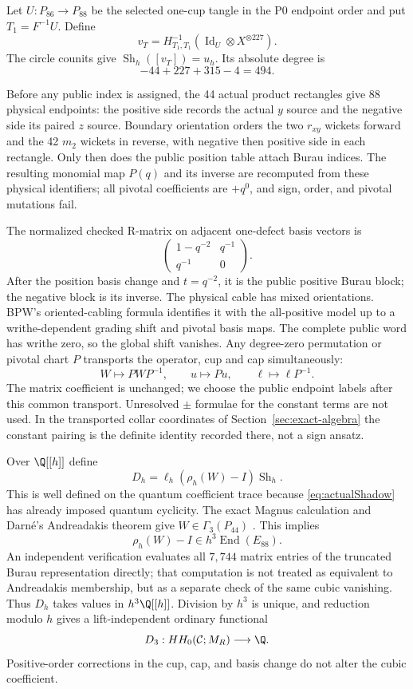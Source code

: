 Let $U:P_{86}\to P_{88}$ be the selected one-cup tangle in the P0 endpoint
order and put $T_1=F^{-1}U$.  Define
\[
v_T=H_{T_1,T_1}^{-1}
  (\operatorname{Id}_U\otimes X^{\otimes227}).
\]
The circle counits give
$\operatorname{Sh}_h([v_T])=u_h$.  Its absolute degree is
\[
-44+227+315-4=494.
\]

Before any public index is assigned, the 44 actual product rectangles give
88 physical endpoints: the positive side records the actual $y$ source and
the negative side its paired $z$ source.  Boundary orientation orders the two
$r_{xy}$ wickets forward and the 42 $m_2$ wickets in reverse, with negative
then positive side in each rectangle.  Only then does the public position
table attach Burau indices.  The resulting monomial map $P(q)$ and its inverse
are recomputed from these physical identifiers; all pivotal coefficients are
$+q^0$, and sign, order, and pivotal mutations fail.

The normalized checked R-matrix on adjacent one-defect basis vectors is
\[
\begin{pmatrix}1-q^{-2}&q^{-1}\\q^{-1}&0\end{pmatrix}.
\]
After the position basis change and $t=q^{-2}$, it is the public positive
Burau block; the negative block is its inverse.  The physical cable has mixed
orientations.  BPW's oriented-cabling formula identifies it with the
all-positive model up to a writhe-dependent grading shift and pivotal basis
maps.  The complete public word has writhe zero, so the global shift
vanishes.  Any degree-zero permutation or pivotal chart $P$ transports the
operator, cup and cap simultaneously:
\[
W\mapsto PWP^{-1},\qquad u\mapsto Pu,\qquad
\ell\mapsto\ell P^{-1}.
\]
The matrix coefficient is unchanged; we choose the public endpoint labels
after this common transport.  Unresolved $\pm$ formulae for the constant
terms are not used.  In the transported collar coordinates of
Section~\ref{sec:exact-algebra} the constant pairing is the definite
identity recorded there, not a sign ansatz.

Over $\Q[[h]]$ define
\[
D_h=\ell_h(\rho_h(W)-I)\operatorname{Sh}_h.
\]
This is well defined on the quantum coefficient trace because
\eqref{eq:actualShadow} has already imposed quantum cyclicity.  The exact
Magnus calculation and Darn\'e's Andreadakis theorem give
$W\in\Gamma_3(P_{44})$ \cite[Theorem~6.2]{Darne2021}.  This implies
\[
\rho_h(W)-I\in h^3\operatorname{End}(E_{88}).
\]
An independent verification evaluates all $7{,}744$ matrix entries of the
truncated Burau representation directly; that computation is not treated as
equivalent to Andreadakis membership, but as a separate check of the same
cubic vanishing.
Thus $D_h$ takes values in $h^3\Q[[h]]$.  Division by $h^3$ is unique, and
reduction modulo $h$ gives a lift-independent ordinary functional
\[
D_3:HH_0(\mathcal C;M_R)\longrightarrow\Q.
\]
Positive-order corrections in the cup, cap, and basis change do not alter
the cubic coefficient.

